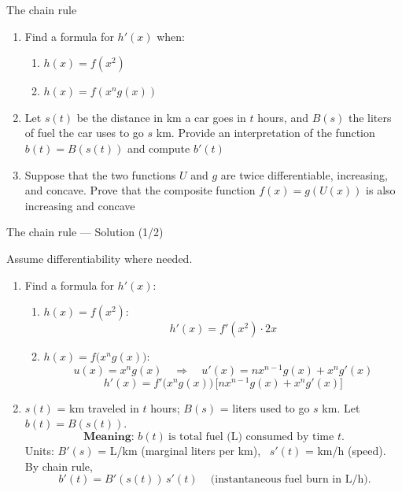 \documentclass[9pt]{beamer}
\begin{document}
\begin{frame}{The chain rule}

    \begin{enumerate}[leftmargin = 0.5cm, label = \arabic*., rightmargin = 0.2cm]
        \item Find a formula for $h'(x)$ when:
        \begin{enumerate}[leftmargin = 0.5cm, label = (\alph*), rightmargin = 0.2cm]
            \item $h(x) = f(x^2)$
            \item $h(x) = f(x^ng(x))$
        \end{enumerate}

        \item Let $s(t)$ be the distance in km a car goes in $t$ hours, and $B(s)$ the liters of fuel the car uses to go $s$ km. Provide an interpretation of the function $b(t) = B(s(t))$ and compute $b'(t)$

        \item Suppose that the two functions $U$ and $g$ are twice differentiable, increasing, and concave. Prove that the composite function $f(x) = g(U(x))$ is also increasing and concave
    \end{enumerate}
    
\end{frame}

\begin{frame}{The chain rule — Solution (1/2)}

\small
Assume differentiability where needed.

\begin{enumerate}[leftmargin=0.55cm, label=\arabic*., rightmargin=0.2cm]

\item Find a formula for $h'(x)$:
  \begin{enumerate}[leftmargin=0.5cm, label=(\alph*), rightmargin=0.2cm]
    \item $h(x)=f(x^2)$:
    \[
      \boxed{\,h'(x)=f'(x^2)\cdot 2x\,}
    \]
    \item $h(x)=f\!\big(x^n g(x)\big)$:
    \[
      u(x)=x^n g(x)\quad\Rightarrow\quad
      u'(x)=n x^{n-1} g(x)+x^n g'(x)
    \]
    \[
      \boxed{\,h'(x)=f'\!\big(x^n g(x)\big)\,\big[n x^{n-1} g(x)+x^n g'(x)\big]\,}
    \]
  \end{enumerate}

\item $s(t)$ = km traveled in $t$ hours; $B(s)$ = liters used to go $s$ km.  
Let $b(t)=B(s(t))$.
\[
\textbf{Meaning: } b(t)\ \text{is total fuel (L) consumed by time }t.
\]
Units: $B'(s)$ = L/km (marginal liters per km), \ $s'(t)$ = km/h (speed).  
By chain rule,
\[
\boxed{\,b'(t)=B'(s(t))\,s'(t)\,} \quad \text{(instantaneous fuel burn in L/h).}
\]

\end{enumerate}

\end{frame}
\end{document}
